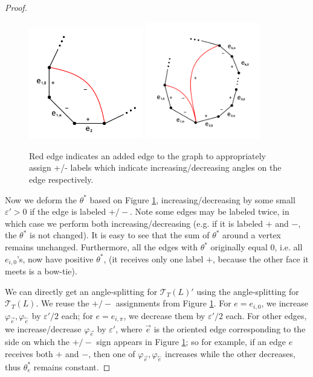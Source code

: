 \documentclass[11pt]{amsart}
\newcommand{\sT}{{\mathcal{T}}}
\newcommand{\cev}[1]{\overset{\leftarrow}{#1}}
\newcommand{\vphi}{\varphi}
\newcommand{\veps}{\varepsilon}
\theoremstyle{plain}
\theoremstyle{definition}
\begin{document}
\begin{proof}
\begin{figure}
\includegraphics[width=5cm]{more_pictures/one_edge.png}
\includegraphics[width=5cm]{more_pictures/two_edge_many.png}
\caption{Red edge indicates an added edge to the graph to appropriately assign +/- labels which indicate 
increasing/decreasing angles on the edge respectively.}
\label{f:adding_edges}
\end{figure}

Now we deform the $\theta^*$ based on Figure \ref{f:adding_edges},
increasing/decreasing by some small $\veps' > 0$ if the edge
is labeled $+/-$.
Note some edges may be labeled twice, in which case we perform
both increasing/decreasing (e.g. if it is labeled $+$ and $-$,
the $\theta^*$ is not changed).
It is easy to see that the sum of $\theta^*$ around a vertex
remains unchanged.
Furthermore, all the edges with $\theta^*$ originally equal 0,
i.e. all $e_{i,0}$'s,
now have positive $\theta^*$,
(it receives only one label $+$,
because the other face it meets is a bow-tie).



We can directly get an angle-splitting for $\sT_T(L)'$
using the angle-splitting for $\sT_T(L)$.
We reuse the $+/-$ assignments from Figure \ref{f:adding_edges}.
For $e = e_{i,0}$, we increase $\vphi_{\vec{e}}, \vphi_{\cev{e}}$
by $\veps'/2$ each; for $e = e_{i,\pi}$,
we decrease them by $\veps'/2$ each.
For other edges, we increase/decrease $\vphi_{\vec{e}}$ by $\veps'$,
where $\vec{e}$ is the oriented edge corresponding to the side
on which the $+/-$ sign appears in Figure \ref{f:adding_edges};
so for example, if an edge $e$ receives both $+$ and $-$,
then one of $\vphi_{\vec{e}},\vphi_{\cev{e}}$ increases
while the other decreases, thus $\theta_e^*$ remains constant.



\end{proof}
\end{document}
